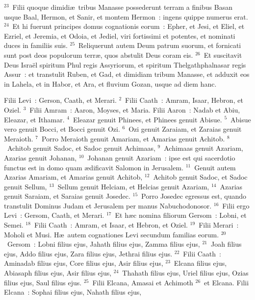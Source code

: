 ${}^{23}$~Filii quoque dimidi\ae\ tribus Manasse possederunt terram a finibus Basan usque Baal, Hermon, et Sanir, et montem Hermon~: ingens quippe numerus erat.
${}^{24}$~Et hi fuerunt principes domus cognationis eorum~: Epher, et Jesi, et Eliel, et Ezriel, et Jeremia, et Odoia, et Jediel, viri fortissimi et potentes, et nominati duces in familiis suis.
${}^{25}$~Reliquerunt autem Deum patrum suorum, et fornicati sunt post deos populorum terr\ae , quos abstulit Deus coram eis.
${}^{26}$~Et suscitavit Deus Isra\"el spiritum Phul regis Assyriorum, et spiritum Thelgathphalnasar regis Assur~: et transtulit Ruben, et Gad, et dimidiam tribum Manasse, et adduxit eos in Lahela, et in Habor, et Ara, et fluvium Gozan, usque ad diem hanc.

\lettrine[lines=3,image=true,loversize=0.05,lraise=-0.03]{F}{}ilii Levi~: Gerson, Caath, et Merari.
${}^{2}$~Filii Caath~: Amram, Isaar, Hebron, et Oziel.
${}^{3}$~Filii Amram~: Aaron, Moyses, et Maria. Filii Aaron~: Nadab et Abiu, Eleazar, et Ithamar.
${}^{4}$~Eleazar genuit Phinees, et Phinees genuit Abisue.
${}^{5}$~Abisue vero genuit Bocci, et Bocci genuit Ozi.
${}^{6}$~Ozi genuit Zaraiam, et Zaraias genuit Meraioth.
${}^{7}$~Porro Meraioth genuit Amariam, et Amarias genuit Achitob.
${}^{8}$~Achitob genuit Sadoc, et Sadoc genuit Achimaas,
${}^{9}$~Achimaas genuit Azariam, Azarias genuit Johanan,
${}^{10}$~Johanan genuit Azariam~: ipse est qui sacerdotio functus est in domo quam \ae dificavit Salomon in Jerusalem.
${}^{11}$~Genuit autem Azarias Amariam, et Amarias genuit Achitob,
${}^{12}$~Achitob genuit Sadoc, et Sadoc genuit Sellum,
${}^{13}$~Sellum genuit Helciam, et Helcias genuit Azariam,
${}^{14}$~Azarias genuit Saraiam, et Saraias genuit Josedec.
${}^{15}$~Porro Josedec egressus est, quando transtulit Dominus Judam et Jerusalem per manus Nabuchodonosor.
${}^{16}$~Filii ergo Levi~: Gersom, Caath, et Merari.
${}^{17}$~Et h\ae c nomina filiorum Gersom~: Lobni, et Semei.
${}^{18}$~Filii Caath~: Amram, et Isaar, et Hebron, et Oziel.
${}^{19}$~Filii Merari~: Moholi et Musi. H\ae\ autem cognationes Levi secundum familias eorum.
${}^{20}$~Gersom~: Lobni filius ejus, Jahath filius ejus, Zamma filius ejus,
${}^{21}$~Joah filius ejus, Addo filius ejus, Zara filius ejus, Jethrai filius ejus.
${}^{22}$~Filii Caath~: Aminadab filius ejus, Core filius ejus, Asir filius ejus,
${}^{23}$~Elcana filius ejus, Abiasaph filius ejus, Asir filius ejus,
${}^{24}$~Thahath filius ejus, Uriel filius ejus, Ozias filius ejus, Saul filius ejus.
${}^{25}$~Filii Elcana, Amasai et Achimoth
${}^{26}$~et Elcana. Filii Elcana~: Sophai filius ejus, Nahath filius ejus,
